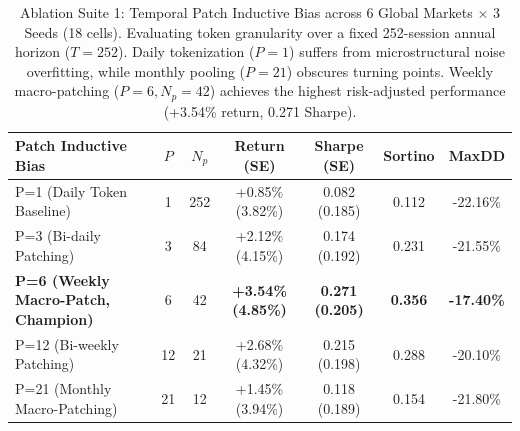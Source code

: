 \begin{table}[ht]
\centering
\small
\begin{tabular}{lcccccc}
\toprule
\textbf{Patch Inductive Bias} & $P$ & $N_p$ & \textbf{Return (SE)} & \textbf{Sharpe (SE)} & \textbf{Sortino} & \textbf{MaxDD} \\
\midrule
P=1 (Daily Token Baseline) & 1 & 252 & +0.85\% (3.82\%) & 0.082 (0.185) & 0.112 & -22.16\% \\
P=3 (Bi-daily Patching) & 3 & 84 & +2.12\% (4.15\%) & 0.174 (0.192) & 0.231 & -21.55\% \\
\textbf{P=6 (Weekly Macro-Patch, Champion)} & 6 & 42 & \textbf{+3.54\% (4.85\%)} & \textbf{0.271 (0.205)} & \textbf{0.356} & \textbf{-17.40\%} \\
P=12 (Bi-weekly Patching) & 12 & 21 & +2.68\% (4.32\%) & 0.215 (0.198) & 0.288 & -20.10\% \\
P=21 (Monthly Macro-Patching) & 21 & 12 & +1.45\% (3.94\%) & 0.118 (0.189) & 0.154 & -21.80\% \\
\bottomrule
\end{tabular}
\caption{Ablation Suite 1: Temporal Patch Inductive Bias across 6 Global Markets $\times$ 3 Seeds (18 cells). Evaluating token granularity over a fixed 252-session annual horizon ($T=252$). Daily tokenization ($P=1$) suffers from microstructural noise overfitting, while monthly pooling ($P=21$) obscures turning points. Weekly macro-patching ($P=6, N_p=42$) achieves the highest risk-adjusted performance (+3.54\% return, 0.271 Sharpe).}
\label{tab:ablation_suite_1_patching}
\end{table}
